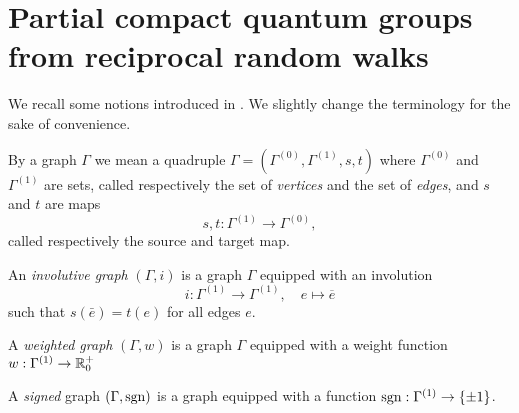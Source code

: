 



\section{Partial compact quantum groups from reciprocal random walks} 


We recall some notions introduced in \cite{DCY1}. We slightly change the terminology for the sake of convenience.

\begin{Def} By a graph $\Gamma$ we mean a quadruple $\Gamma=(\Gamma^{(0)},\Gamma^{(1)},s,t)$ where $\Gamma^{(0)}$ and $\Gamma^{(1)}$ are sets, called respectively the set of \emph{vertices} and the set of \emph{edges}, and $s$ and $t$ are maps \[s,t:\Gamma^{(1)}\rightarrow \Gamma^{(0)},\] called respectively the source and target map.%

An \emph{involutive graph} $(\Gamma,i)$ is a graph $\Gamma$ equipped with an involution \[i:\Gamma^{(1)} \rightarrow \Gamma^{(1)},\quad e\mapsto \overline{e}\] such that $s(\bar{e}) = t(e)$ for all edges $e$.

A \emph{weighted graph} $(\Gamma,w)$ is a graph $\Gamma$ equipped with a weight function $w:\Gamma^{(1)}\rightarrow \mathbb{R}_0^+$

 A \emph{signed} graph $(\Gamma,\operatorname{\mathrm{sgn}})$ is a graph equipped with a function $\operatorname{\mathrm{sgn}}:\Gamma^{(1)}\rightarrow \{\pm 1\}$.  
\end{Def}




